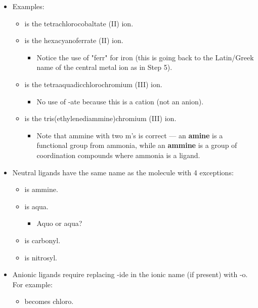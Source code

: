 \documentclass[../notes.tex]{subfiles}
\begin{document}
\begin{itemize}
\begin{enumerate}
    \end{enumerate}
    \item Examples:
    \begin{itemize}
        \item {} is the tetrachlorocobaltate (II) ion.
        \item {} is the hexacyanoferrate (II) ion.
        \begin{itemize}
            \item Notice the use of "ferr" for iron (this is going back to the Latin/Greek name of the central metal ion as in Step 5).
        \end{itemize}
        \item \ce{[Cr(H2O)4Cl2]+} is the tetraaquadicchlorochromium (III) ion.
        \begin{itemize}
            \item No use of -ate because this is a cation (not an anion).
        \end{itemize}
        \item {} is the tris(ethylenediammine)chromium (III) ion.
        \begin{itemize}
            \item Note that ammine with two m's is correct --- an \textbf{amine} is a functional group from ammonia, while an \textbf{ammine} is a group of coordination compounds where ammonia is a ligand.
        \end{itemize}
    \end{itemize}
    \item Neutral ligands have the same name as the molecule with 4 exceptions:
    \begin{itemize}
        \item {} is ammine.
        \item {} is aqua.
        \begin{itemize}
            \item Aquo or aqua?
        \end{itemize}
        \item {} is carbonyl.
        \item {} is nitrosyl.
    \end{itemize}
    \item Anionic ligands require replacing -ide in the ionic name (if present) with -o. For example:
    \begin{itemize}
        \item {} becomes chloro.

\end{itemize}
\end{itemize}
\end{document}
